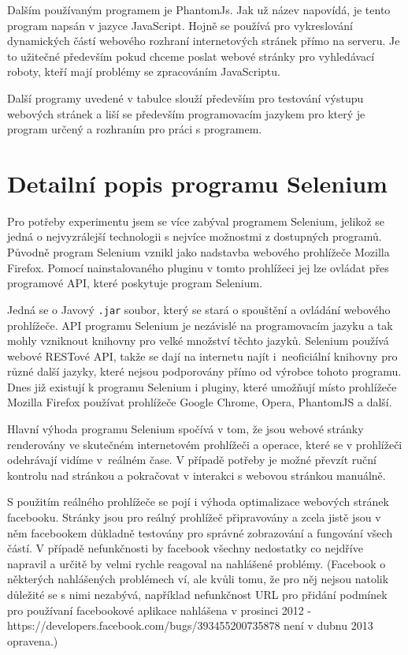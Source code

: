 \documentclass[thesis=M,czech]{FITthesis}[2013/05/10]
\begin{document}
Dalším používaným programem je PhantomJs. Jak už název napovídá, je tento program napsán v jazyce JavaScript. Hojně se používá pro vykreslování dynamických částí webového rozhraní internetových stránek přímo na serveru. Je to užitečné především pokud chceme poslat webové stránky pro vyhledávací roboty, kteří mají problémy se zpracováním JavaScriptu. 

Další programy uvedené v tabulce slouží především pro testování výstupu webových stránek a liší se především programovacím jazykem pro který je program určený a rozhraním pro práci s programem.

\section{Detailní popis programu Selenium}

Pro potřeby experimentu jsem se více zabýval programem Selenium, jelikož se jedná o nejvyzrálejší technologii s nejvíce možnostmi z dostupných programů. Původně program Selenium vznikl jako nadstavba webového prohlížeče Mozilla Firefox. Pomocí nainstalovaného pluginu v tomto prohlížeci jej lze ovládat přes programové API, které poskytuje program Selenium. 

Jedná se o Javový \verb|.jar| soubor, který se stará o spouštění a ovládání webového prohlížeče. API programu Selenium je nezávislé na programovacím jazyku a tak mohly vzniknout knihovny pro velké množství těchto jazyků. Selenium používá webové RESTové API, takže se dají na internetu najít i~neoficiální knihovny pro různé další jazyky, které nejsou podporovány přímo od výrobce tohoto programu. Dnes již existují k programu Selenium i pluginy, které umožňují místo prohlížeče Mozilla Firefox používat prohlížeče Google Chrome, Opera, PhantomJS a další.

Hlavní výhoda programu Selenium spočívá v tom, že jsou webové stránky renderovány ve skutečném internetovém prohlížeči a operace, které se v prohlížeči odehrávají vidíme v~reálném čase. V případě potřeby je možné převzít ruční kontrolu nad stránkou a pokračovat v interakci s webovou stránkou manuálně. 

S použitím reálného prohlížeče se pojí i výhoda optimalizace webových stránek facebooku. Stránky jsou pro reálný prohlížeč připravovány a zcela jistě jsou v něm facebookem důkladně testovány pro správné 
zobrazování a fungování všech částí. V případě nefunkčnosti by facebook všechny nedostatky co nejdříve napravil a určitě by velmi rychle reagoval na nahlášené problémy. (Facebook o některých nahlášených problémech ví, ale kvůli tomu, že pro něj nejsou natolik důležité se s nimi nezabývá, například nefunkčnost URL pro přidání podmínek pro používaní facebookové aplikace  nahlášena v prosinci 2012 - https://developers.facebook.com/bugs/393455200735878  není v dubnu 2013 opravena.) 
\end{document}
